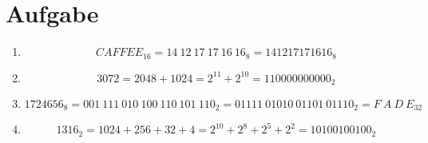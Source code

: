 \documentclass[DIN, pagenumber=false, fontsize=11pt, parskip=half]{scrartcl}
\begin{document}
    \section{Aufgabe}
    \begin{enumerate}[label = (\alph*)]
        \item
            \begin{equation*}
                {CAFFEE}_{16} = {14\ 12\ 17\ 17\ 16\ 16}_8 = {141217171616}_8
            \end{equation*}
        \item
            \begin{equation*}
                3072 = 2048 + 1024 = 2^{11} + 2^{10} = {110000000000}_2
            \end{equation*}
        \item
            \begin{equation*}
                {1724656}_8 = {001\ 111\ 010\ 100\ 110\ 101\ 110}_2 = {01111\ 01010\ 01101\ 01110}_2 
                    = {F\ A\ D\ E}_{32}
            \end{equation*}
        \item 
            \begin{equation*}
                1316_2 = 1024 + 256 + 32 + 4 = 2^{10} + 2^8 + 2^5 + 2^2 = {10100100100}_2
            \end{equation*}
    \end{enumerate}
\end{document}

